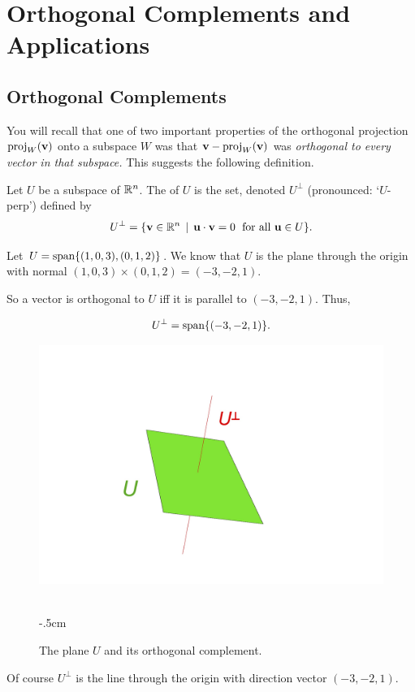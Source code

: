 \chapter{Orthogonal Complements and Applications}
\label{chapter:20OrthogComp}

\section{Orthogonal Complements}
You will recall that one of two important properties of the orthogonal projection $\operatorname{proj}_W(\mathbf{v})$ onto a subspace  $W$ was that $\mathbf{v}-\operatorname{proj}_W(\mathbf{v})$ was {\it orthogonal to every vector in that subspace.} This suggests the following definition.



\begin{definition}
Let $U$ be a subspace of $\mathbb{R}^n$.  The  of $U$
is the set, denoted $U^\perp$ (pronounced: `$U$-perp') defined by
$$
U^\perp = \{ \mathbf{v} \in \mathbb{R}^n \,\mid \,\mathbf{u} \cdot \mathbf{v} = 0 \textrm{\; for all $\mathbf{u}\in U$} \}.
$$
\end{definition}

\begin{myexample}


Let $U = \textrm{span}\{ (1,0,3), (0,1,2)\}$. We know that $U$ is the plane through the origin with normal $(1,0,3) \times (0,1,2)=(-3, -2, 1)$. 



So a vector is orthogonal to $U$ iff it is parallel to $(-3, -2, 1)$. Thus,  

$$U^\perp=\textrm{span}\{(-3, -2, 1)\}.$$ 
\begin{figure}
\begin{center}
\includegraphics[scale=.5] {img/uperp.jpg}~
\end{center} 
\vglue-.5cm
\caption{The plane $U$ and its orthogonal complement.}\label{figure:Uperp}
\end{figure}

Of course $U^\perp$ is the line through the origin with direction vector $(-3, -2, 1)$.


\end{myexample}


